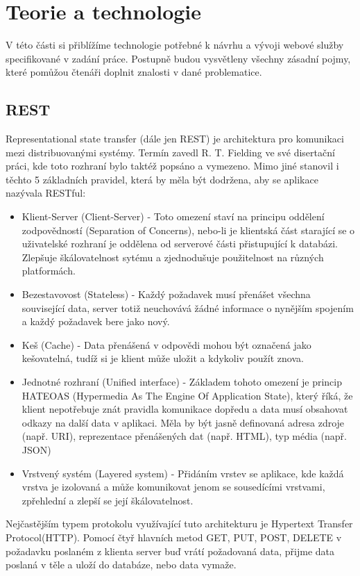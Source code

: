    
  \chapter{Teorie a technologie}
  V této části si přiblížíme technologie potřebné k návrhu a vývoji webové služby specifikované v zadání práce. Postupně budou vysvětleny všechny zásadní pojmy, které pomůžou čtenáři doplnit znalosti v dané problematice.
  
  \section{REST}
	Representational state transfer (dále jen REST) je architektura pro komunikaci  mezi distribuovanými systémy. Termín zavedl R. T. Fielding ve své disertační práci\cite{restThesis}, kde toto rozhraní bylo taktéž popsáno a vymezeno. Mimo jiné stanovil i těchto 5 základních pravidel, která by měla být dodržena, aby se aplikace nazývala RESTful\cite{rest}:
	\begin{itemize}
		\item Klient-Server (Client-Server) - Toto omezení staví na principu oddělení zodpovědností (Separation of Concerns), nebo-li je klientská část starající se o uživatelské rozhraní je oddělena od serverové části přistupující k databázi. Zlepšuje škálovatelnost sytému a zjednodušuje použitelnost na různých platformách.
		\item Bezestavovost (Stateless) - Každý požadavek musí přenášet všechna související data, server totiž neuchovává žádné informace o nynějším spojením a každý požadavek bere jako nový.
		\item Keš (Cache) - Data přenášená v odpovědi mohou být označená jako kešovatelná, tudíž si je klient může uložit a kdykoliv použít znova.
		\item Jednotné rozhraní (Unified interface) - Základem tohoto omezení je princip HATEOAS (Hypermedia As The Engine Of Application State), který říká, že klient nepotřebuje znát pravidla komunikace dopředu a data musí obsahovat odkazy na další data v aplikaci. Měla by být jasně definovaná adresa zdroje (např. URI), reprezentace přenášených dat (např. HTML), typ média (např. JSON)
		\item Vrstvený systém (Layered system) - Přidáním vrstev se aplikace, kde každá vrstva je izolovaná a může komunikovat jenom se sousedícími vrstvami, zpřehlední a zlepší se její škálovatelnost.
	\end{itemize}	
	Nejčastějším typem protokolu využívající tuto architekturu je Hypertext Transfer Protocol(HTTP). Pomocí čtyř hlavních metod GET, PUT, POST, DELETE v požadavku poslaném z klienta server buď vrátí požadovaná data, přijme data poslaná v těle a uloží do databáze, nebo data vymaže. 

